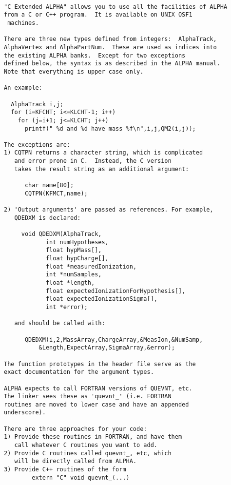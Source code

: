 \par
\begin{verbatim}
 
"C Extended ALPHA" allows you to use all the facilities of ALPHA
from a C or C++ program.  It is available on UNIX OSF1
 machines.
 
There are three new types defined from integers:  AlphaTrack,
AlphaVertex and AlphaPartNum.  These are used as indices into
the existing ALPHA banks.  Except for two exceptions
defined below, the syntax is as described in the ALPHA manual.
Note that everything is upper case only.
 
An example:
 
  AlphaTrack i,j;
  for (i=KFCHT; i<=KLCHT-1; i++)
    for (j=i+1; j<=KLCHT; j++)
      printf(" %d and %d have mass %f\n",i,j,QM2(i,j));
 
The exceptions are:
1) CQTPN returns a character string, which is complicated
   and error prone in C.  Instead, the C version
   takes the result string as an additional argument:
 
      char name[80];
      CQTPN(KFMCT,name);
 
2) 'Output arguments' are passed as references. For example,
   QDEDXM is declared:
 
     void QDEDXM(AlphaTrack,
            int numHypotheses,
            float hypMass[],
            float hypCharge[],
            float *measuredIonization,
            int *numSamples,
            float *length,
            float expectedIonizationForHypothesis[],
            float expectedIonizationSigma[],
            int *error);
 
   and should be called with:
 
      QDEDXM(i,2,MassArray,ChargeArray,&MeasIon,&NumSamp,
          &Length,ExpectArray,SigmaArray,&error);
 
The function prototypes in the header file serve as the
exact documentation for the argument types.
 
ALPHA expects to call FORTRAN versions of QUEVNT, etc.
The linker sees these as 'quevnt_' (i.e. FORTRAN
routines are moved to lower case and have an appended
underscore).
 
There are three approaches for your code:
1) Provide these routines in FORTRAN, and have them
   call whatever C routines you want to add.
2) Provide C routines called quevnt_, etc, which
   will be directly called from ALPHA.
3) Provide C++ routines of the form
        extern "C" void quevnt_(...)
 

\end{verbatim}

